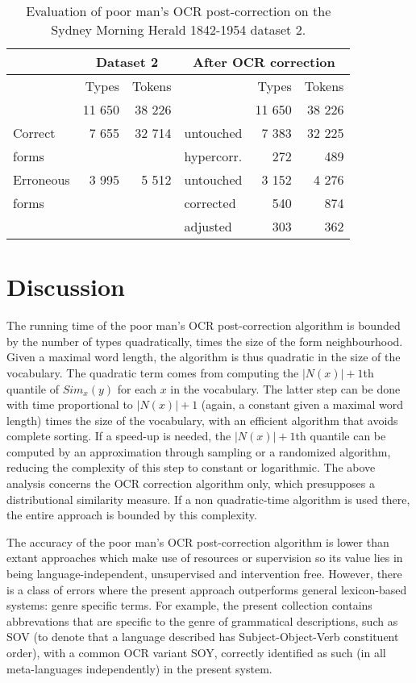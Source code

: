 \documentclass{sig-alternate}
\begin{document}
\begin{table}
\centering
\caption{Evaluation of poor man's OCR post-correction on the Sydney Morning Herald 1842-1954 dataset 2.}
\label{eval}
\begin{tabular}{l|r r|l r r}
          & \multicolumn{2}{c}{Dataset 2} & \multicolumn{3}{c}{After OCR correction}\\ \hline
          & Types & Tokens & & Types & Tokens\\
          & 11 650 & 38 226 & & 11 650 & 38 226\\ \hline
Correct & 7 655 & 32 714 & untouched & 7 383 & 32 225\\
forms   &       &        & hypercorr. & 272 & 489\\
\hline
Erroneous & 3 995 & 5 512 & untouched & 3 152 & 4 276\\
forms	   &       &       & corrected & 540 & 874\\
           &       &       & adjusted & 303 & 362\\
\end{tabular}
\end{table}



\section{Discussion}
\label{disc}
The running time of the poor man's OCR post-correction algorithm is
bounded by the number of types quadratically, times the size of the
form neighbourhood. Given a maximal word length, the algorithm is thus
quadratic in the size of the vocabulary. The quadratic term comes from
computing the $|N(x)|+1$th quantile of $Sim_x(y)$ for each $x$ in the
vocabulary. The latter step can be done with time proportional to
$|N(x)|+1$ (again, a constant given a maximal word length) times the
size of the vocabulary, with an efficient algorithm that avoids
complete sorting.  If a speed-up is needed, the $|N(x)|+1$th quantile
can be computed by an approximation through sampling or a randomized
algorithm, reducing the complexity of this step to constant or
logarithmic. The above analysis concerns the OCR correction algorithm
only, which presupposes a distributional similarity measure. If a non
quadratic-time algorithm is used there, the entire approach is bounded
by this complexity.

The accuracy of the poor man's OCR post-correction algorithm is lower
than extant approaches which make use of resources or supervision so
its value lies in being language-independent, unsupervised
and intervention free. However, there is a class of errors where
the present approach outperforms general lexicon-based systems: genre specific
terms. For example, the present collection contains abbrevations
that are specific to the genre of grammatical descriptions, such as
SOV (to denote that a language described has Subject-Object-Verb constituent
order), with a common OCR variant SOY, correctly identified as such
(in all meta-languages independently) in the present system.
\end{document}
